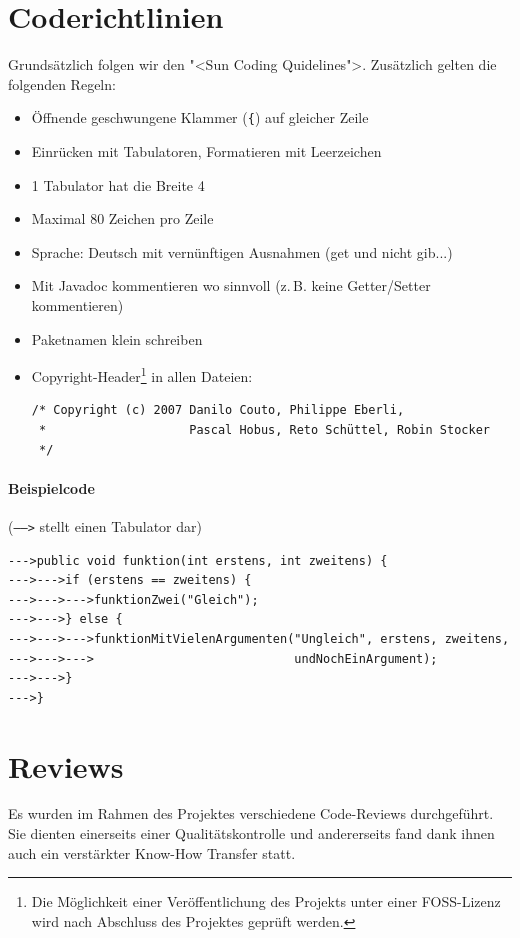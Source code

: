 \documentclass[12pt,halfparskip]{scrartcl}
\begin{document}


\section{Coderichtlinien}\label{sub:coderichtlinien} %

Grundsätzlich folgen wir den "<Sun Coding Quidelines">. Zusätzlich gelten die folgenden Regeln:

\begin{itemize}
  \item Öffnende geschwungene Klammer (\texttt{\{}) auf gleicher Zeile
  \item Einrücken mit Tabulatoren, Formatieren mit Leerzeichen
  \item 1 Tabulator hat die Breite 4
  \item Maximal 80 Zeichen pro Zeile
  \item Sprache: Deutsch mit vernünftigen Ausnahmen (get und nicht gib...)
  \item Mit Javadoc kommentieren wo sinnvoll (z.\,B. keine Getter/Setter kommentieren)
  \item Paketnamen klein schreiben
  \item Copyright-Header\footnote{Die Möglichkeit einer Veröffentlichung des Projekts unter einer FOSS-Lizenz wird nach Abschluss des Projektes geprüft werden.} in allen Dateien:
    \begin{verbatim}
/* Copyright (c) 2007 Danilo Couto, Philippe Eberli,
 *                    Pascal Hobus, Reto Schüttel, Robin Stocker
 */
    \end{verbatim}
\end{itemize}


\paragraph{Beispielcode} (\texttt{----->} stellt einen Tabulator dar)

\begin{verbatim}
--->public void funktion(int erstens, int zweitens) {
--->--->if (erstens == zweitens) {
--->--->--->funktionZwei("Gleich");
--->--->} else {
--->--->--->funktionMitVielenArgumenten("Ungleich", erstens, zweitens,
--->--->--->                            undNochEinArgument);
--->--->}
--->}
\end{verbatim}

\section{Reviews} %
\label{sec:reviews}
Es wurden im Rahmen des Projektes verschiedene Code-Reviews durchgeführt. Sie dienten einerseits einer Qualitätskontrolle und andererseits fand dank ihnen auch ein verstärkter Know-How Transfer statt.
\end{document}
